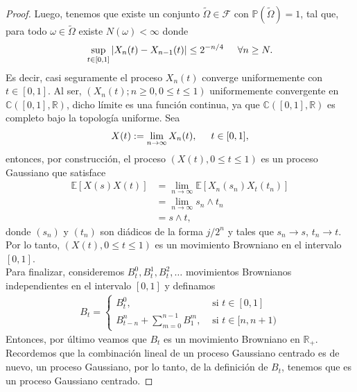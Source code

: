 \begin{proof}
Luego, tenemos que existe un conjunto $\tilde{\Omega} \in \mathcal{F}$ con $\mathbb{P}(\tilde{\Omega}) = 1$, tal que, para todo $\omega \in \tilde{\Omega}$ existe $N(\omega) < \infty$ donde
	\begin{align*}
		\sup_{t \in [0, 1]} |X_n (t) - X_{n-1} (t)| \leq 2^{-n / 4} \hspace{0.5cm} \forall n \geq N.
	\end{align*}
Es decir, casi seguramente el proceso $X_n (t)$ converge uniformemente con $t \in [0, 1]$. Al ser, $(X_n (t); n \geq 0, 0 \leq t \leq 1)$ uniformemente convergente en $\mathbb{C}([0, 1], \mathbb{R})$, dicho límite es una función continua, ya que $\mathbb{C}([0, 1], \mathbb{R})$ es completo bajo la topología uniforme. Sea 
	\begin{align*}
		X(t) := \lim_{n \rightarrow \infty} X_n (t), \hspace{0.5cm} t \in [0, 1], 
	\end{align*}
entonces, por construcción, el proceso $(X(t), 0 \leq t \leq 1)$ es un proceso Gaussiano que satisface
	\begin{align*}
		\mathbb{E} \left[ X(s) X(t) \right] & = \lim_{n \rightarrow \infty} \mathbb{E} [X_n (s_n) X_t (t_n)] \\
		& = \lim_{n \rightarrow \infty} s_n \wedge t_n \\
		& = s \wedge t, 
	\end{align*}
donde $(s_n)$ y $(t_n)$ son diádicos de la forma $j / 2^n$ y tales que $s_n \rightarrow s$, $t_n \rightarrow t$. Por lo tanto, $(X (t), 0 \leq t \leq 1)$ es un movimiento Browniano en el intervalo $[0, 1]$. \\

Para finalizar, consideremos $B_t^0, B_t^1, B_t^2, \ldots$ movimientos Brownianos independientes en el intervalo $[0, 1]$ y definamos
	\begin{align*}
		B_t = 
		\begin{cases}
		B_t^0, & \text{ si } t \in [0, 1] \\
		B_{t-n}^n + \sum_{m = 0}^{n-1} B_1^m, & \text{ si } t \in [n, n+1)
		\end{cases}
	\end{align*}
Entonces, por último veamos que $B_t$ es un movimiento Browniano en $\mathbb{R}_{+}$. \\

Recordemos que la combinación lineal de un proceso Gaussiano centrado es de nuevo, un proceso Gaussiano, por lo tanto, de la definición de $B_t$, tenemos que es un proceso Gaussiano centrado. 


\end{proof}
